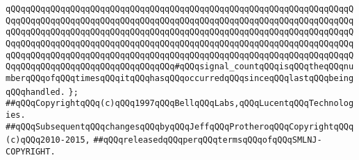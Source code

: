 \verb|qQQqqQQqqQQqqQQqqQQqqQQqqQQqqQQqqQQqqQQqqQQqqQQqqQQqqQQqqQQqqQQqqQQqqQQqqQQqqQQqqQQqqQQqqQQqqQQqqQQqqQQqqQQqqQQqqQQqqQQqqQQqqQQqqQQqqQQqqQQqqQQqqQQqqQQqqQQqqQQqqQQqqQQqqQQqqQQqqQQqqQQqqQQqqQQqqQQqqQQqqQQqqQQqqQQqqQQqqQQqqQQqqQQqqQQqqQQqqQQqqQQqqQQqqQQqqQQqqQQqqQQqqQQqqQQqqQQqqQQqqQQqqQQqqQQqqQQqqQQqqQQqqQQqqQQqqQQqqQQqqQQqqQQqqQQqqQQqqQQqqQQqqQQqqQQqqQQqqQQqqQQqqQQqqQQqqQQqqQQqqQQq#qQQqsignal_countqQQqisqQQqtheqQQqnumberqQQqofqQQqtimesqQQqitqQQqhasqQQqoccurredqQQqsinceqQQqlastqQQqbeingqQQqhandled.|\newline
\verb|};|\newline
\newline
\newline
\newline
\newline
\verb|##qQQqCopyrightqQQq(c)qQQq1997qQQqBellqQQqLabs,qQQqLucentqQQqTechnologies.|\newline
\verb|##qQQqSubsequentqQQqchangesqQQqbyqQQqJeffqQQqProtheroqQQqCopyrightqQQq(c)qQQq2010-2015,|\newline
\verb|##qQQqreleasedqQQqperqQQqtermsqQQqofqQQqSMLNJ-COPYRIGHT.|\newline

